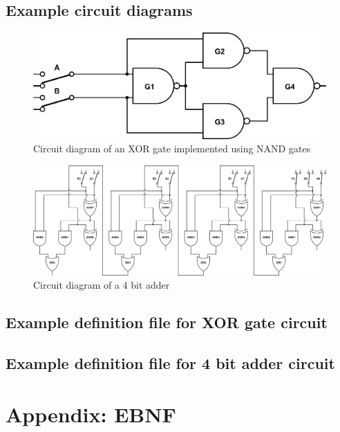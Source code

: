 \documentclass[a4paper,10pt]{article}
\begin{document}
\subsection{Example circuit diagrams}
\begin{figure}[h]
 \centering
 \includegraphics[width=14cm]{../examples/xor.png}
 \caption{Circuit diagram of an XOR gate implemented using NAND gates}
 \label{fig:example-xor}
\end{figure}

\begin{figure}[h]
 \centering
 \includegraphics[width=16cm]{../examples/4-bit-adder.png}
 \caption{Circuit diagram of a 4 bit adder}
 \label{fig:example-adder}
\end{figure}


\subsection{Example definition file for XOR gate circuit}


\subsection{Example definition file for 4 bit adder circuit}


\section{Appendix: EBNF}

\end{document}
